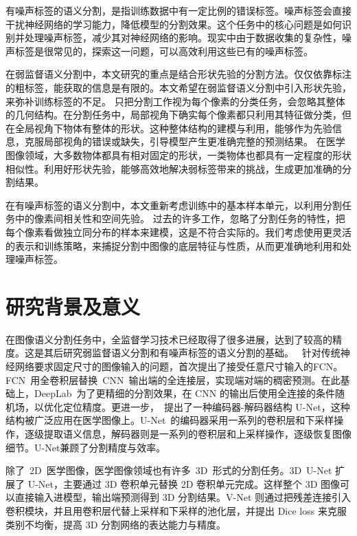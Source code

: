 有噪声标签的语义分割，是指训练数据中有一定比例的错误标签。噪声标签会直接干扰神经网络的学习能力，降低模型的分割效果。这个任务中的核心问题是如何识别并处理噪声标签，减少其对神经网络的影响。现实中由于数据收集的复杂性，噪声标签是很常见的，探索这一问题，可以高效利用这些已有的噪声标签。

在弱监督语义分割中，本文研究的重点是结合形状先验的分割方法。仅仅依靠标注的粗标签，能获取的信息是有限的。本文希望在弱监督语义分割中引入形状先验，来弥补训练标签的不足。
只把分割工作视为每个像素的分类任务，会忽略其整体的几何结构。在分割任务中，局部视角下确实每个像素都只利用其特征做分类，但在全局视角下物体有整体的形状。这种整体结构的建模与利用，能够作为先验信息，克服局部视角的错误或缺失，引导模型产生更准确完整的预测结果。
在医学图像领域，大多数物体都具有相对固定的形状，一类物体也都具有一定程度的形状相似性。利用好形状先验，能够高效地解决弱标签带来的挑战，生成更加准确的分割结果。

在有噪声标签的语义分割中，本文重新考虑训练中的基本样本单元，以利用分割任务中的像素间相关性和空间先验。
过去的许多工作，忽略了分割任务的特性，把每个像素看做独立同分布的样本来建模，这是不符合实际的。我们考虑使用更灵活的表示和训练策略，来捕捉分割中图像的底层特征与性质，从而更准确地利用和处理噪声标签。


\section{研究背景及意义}
在图像语义分割任务中，全监督学习技术已经取得了很多进展，达到了较高的精度。这是其后研究弱监督语义分割和有噪声标签的语义分割的基础。
\citet{Long}~针对传统神经网络要求固定尺寸的图像输入的问题，首次提出了接受任意尺寸输入的FCN。FCN~用全卷积层替换~CNN~输出端的全连接层，实现端对端的稠密预测。在此基础上，DeepLab~为了更精细的分割效果，在 CNN 的输出后使用全连接的条件随机场，以优化定位精度。更进一步，\citet{Ronneberger}~提出了一种编码器-解码器结构 U-Net，这种结构被广泛应用在医学图像上。U-Net~的编码器采用一系列的卷积层和下采样操作，逐级提取语义信息，解码器则是一系列的卷积层和上采样操作，逐级恢复图像细节。U-Net兼顾了分割精度与效率。

除了~2D~医学图像，医学图像领域也有许多~3D~形式的分割任务。3D~U-Net 扩展了 U-Net，主要通过 3D 卷积单元替换 2D 卷积单元完成。这样整个 3D 图像可以直接输入进模型，输出端预测得到 3D 分割结果。V-Net 则通过把残差连接引入卷积模块，并且用卷积层代替上采样和下采样的池化层，并提出 Dice loss 来克服类别不均衡，提高 3D 分割网络的表达能力与精度。

